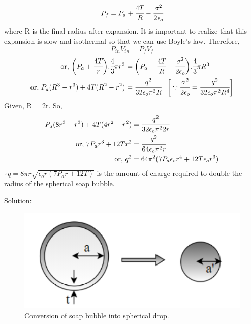 \begin{equation}
    P_f = P_a + \cfrac{4T}{R} - \cfrac{\sigma^2}{2\epsilon_o}
\end{equation}
where R is the final radius after expansion. It is important to realize that this expansion is slow and isothermal so that we can use  Boyle's law. Therefore,
\begin{equation}
    P_{in}V_{in} = P_f V_f
\end{equation}
\begin{align*}
\text{or, }\bigg(P_a + \cfrac{4T}{r}\bigg) . \cfrac{4}{3} \pi r^3 &= \bigg(P_a + \cfrac{4T}{R} - \cfrac{\sigma^2}{2\epsilon_o}\bigg) . \cfrac{4}{3} \pi R^3\\
\text{or, } P_a (R^3 - r^3) + 4T (R^2 - r^2) &= \cfrac{q^2}{32\epsilon_o\pi^2R} \hspace{8pt} \bigg[\because \cfrac{\sigma^2}{2\epsilon_o} = \cfrac{q^2}{32\epsilon_o\pi^2R^4}\bigg]
\end{align*} 
Given, R = 2r. So,
\begin{align*}
P_a (8r^3 - r^3) + 4T (4r^2 - r^2) &= \cfrac{q^2}{32\epsilon_o\pi^2 2r}\\
\text{or, }  7P_ar^3 + 12Tr^2 &= \cfrac{q^2}{64\epsilon_o\pi^2r}\\
\text{or, }q^2 &= 64 \pi^2 (7P_a\epsilon_or^4 + 12 T\epsilon_or^3)
\end{align*}
$\therefore q = 8\pi r \sqrt{\epsilon_or(7P_ar + 12T)}$ is the amount of charge required to double the radius of the spherical soap bubble.

\pagebreak
{}
Solution:\\

\begin{figure}[h]
    \centering
    \includegraphics[scale = 0.8]{figures/Sandesh's Figures/fig3.png}
    \caption{Conversion of soap bubble into spherical drop.}
    \label{fig3}
\end{figure}

